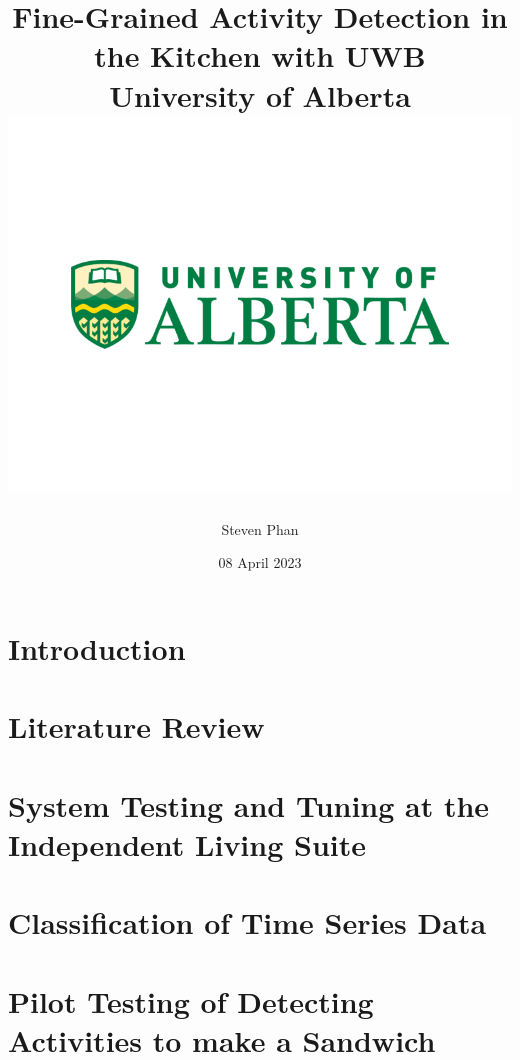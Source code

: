 \documentclass[12pt]{report}
\title{
    {Fine-Grained Activity Detection in the Kitchen with UWB}\\
    {\large University of Alberta}\\
    {\includegraphics[width=\textwidth]{university.png}}
}
\author{Steven Phan}
\date{08 April 2023}
\begin{document}
\maketitle


\tableofcontents

\chapter{Introduction}


\chapter{Literature Review}\label{chp2}


\chapter{System Testing and Tuning at the Independent Living Suite}\label{chp3}


\chapter{Classification of Time Series Data}\label{chp4}


\chapter{Pilot Testing of Detecting Activities to make a Sandwich}

% 



\end{document}
